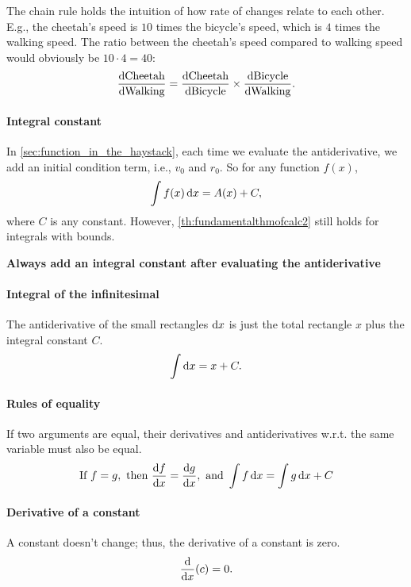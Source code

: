 The chain rule holds the intuition of how rate of changes relate to each other. E.g., the cheetah's speed is $10$ times the bicycle's speed, which is $4$ times the walking speed. The ratio between the cheetah's speed compared to walking speed would obviously be $10\cdot 4 = 40$:
\begin{equation}
  \odv{\textrm{Cheetah}}{\textrm{Walking}} = \odv{\textrm{Cheetah}}{\textrm{Bicycle}} \times \odv{\textrm{Bicycle}}{\textrm{Walking}}.
\end{equation}

\paragraph{Integral constant} In \cref{sec:function_in_the_haystack}, each time we evaluate the antiderivative, we add an initial condition term, i.e., $v_0$ and $r_0$. So for any function $f(x)$,
\begin{equation}
  \int f(x)\odif{x} = A(x) + C,
\end{equation}
where $C$ is any constant. However, \cref{th:fundamentalthmofcalc2} still holds for integrals with bounds.
\begin{center}
  \textbf{\large Always add an integral constant after evaluating the antiderivative}
\end{center}

\paragraph{Integral of the infinitesimal} The antiderivative of the small rectangles $\odif{x}$ is just the total rectangle $x$ plus the integral constant $C$. 
\begin{equation}
  \int \odif{x} = x + C.
\end{equation}

\paragraph{Rules of equality} If two arguments are equal, their derivatives and antiderivatives w.r.t. the same variable must also be equal.
\begin{equation*}
  \textrm{If}~f = g,\textrm{ then }\odv{f}{x} = \odv{g}{x},\textrm{ and }\int f\odif{x} = \int g\odif{x} + C
\end{equation*}

\paragraph{Derivative of a constant} A constant doesn't change; thus, the derivative of a constant is zero. 
\begin{equation}
  \odv*{(c)}{x} = 0.
\end{equation}

